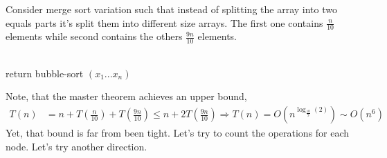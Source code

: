 \begin{example}
Consider merge sort variation such that instead of splitting the array into two equals parts it's split them into different size arrays. The first one contains \( \frac{n}{10} \) elements while second contains the others \( \frac{9n}{10}\) elements.

\begin{algorithm}
\SetAlgoLined
{}
\label{alg:unmerge}
 \ \\ 
    { return bubble-sort \( (x_1 ... x_n)\) } 
 \ \\ 
 
\end{algorithm}
Note, that the master theorem achieves an upper bound, 
\begin{equation*}
    \begin{split}
        T\left(n\right) & = n +  T\left(\frac{n}{10}\right) + T\left(\frac{9n}{10}\right) \le n +  2 T\left(\frac{9n}{10}\right) \Rightarrow T\left(n\right) = O \left( n^{\log_{\frac{10}{9}}\left(2\right)} \right) \sim O \left( n^{ 6 } \right)  
    \end{split}
\end{equation*}
Yet, that bound is far from been tight. Let's try to count the operations for each node. Let's try another direction. 


\end{example}
